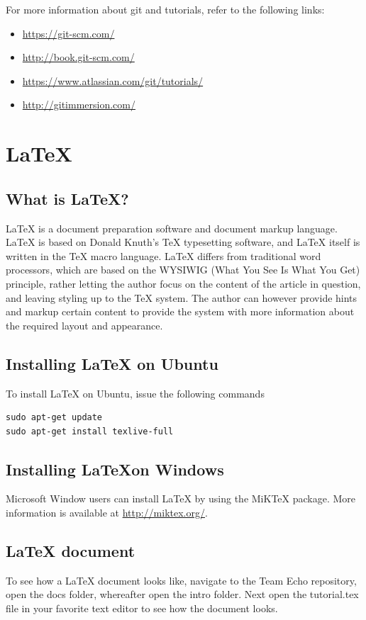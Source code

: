 \documentclass[a4paper,10pt]{article}
\begin{document}
For more information about git and tutorials, refer to the following links:

\begin{itemize}
\item \url{https://git-scm.com/}
\item \url{http://book.git-scm.com/}
\item \url{https://www.atlassian.com/git/tutorials/}
\item \url{http://gitimmersion.com/}
\end{itemize}


\section{\LaTeX{}}
\subsection{What is \LaTeX{}?}

\LaTeX{} is a document preparation software and document markup language. \LaTeX{} is based on Donald Knuth's \TeX{} typesetting software, and LaTeX itself is written in the \TeX{} macro language. \LaTeX{} differs from traditional word processors, which are based on the WYSIWIG (What You See Is What You Get) principle, rather letting the author focus on the content of the article in question, and leaving styling up to the TeX system. The author can however provide hints and markup certain content to provide the system with more information about the required layout and appearance. 

\subsection{Installing \LaTeX{} on Ubuntu}
To install \LaTeX{} on Ubuntu, issue the following commands

\begin{lstlisting}[style=TerminalStyle]
sudo apt-get update
sudo apt-get install texlive-full
\end{lstlisting}


\subsection{Installing \LaTeX on Windows}
Microsoft Window users can install \LaTeX{} by using the MiKTeX package. More information is available at \url{http://miktex.org/}.

\subsection{\LaTeX{} document}
To see how a \LaTeX{} document looks like, navigate to the Team Echo repository, open the docs folder, whereafter open the intro folder. Next open the tutorial.tex file in your favorite text editor to see how the document looks.
\end{document}
